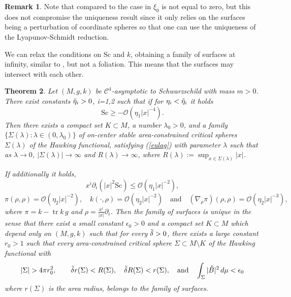 \documentclass[12pt,a4paper]{amsart}
\theoremstyle{plain}
\newtheorem{theorem}{Theorem}[section]
\theoremstyle{definition}
\newtheorem{remark}[theorem]{Remark}
\newcommand{\tr}{\operatorname{tr}}
\begin{document}
\begin{remark}
    Note that compared to the case in \cite{eichko} $\xi_0 $ is not equal to zero, but this does not compromise the uniqueness result since it only relies on the surfaces being a perturbation of coordinate spheres so that one can use the uniqueness of the Lyapunov-Schmidt reduction.
\end{remark}
We can relax the conditions on $\mathrm{Sc}$ and $k$, obtaining a family of surfaces at infinity, similar to \cite[Theorem 6]{willcen}, but not a foliation. This means that the surfaces may intersect with each other. 
\begin{theorem}\label{family}
     Let $(M,g,k)$ be $ \mathcal{C}^4$-asymptotic to Schwarzschild with mass $m>0$. There exist constants $ \Tilde{\eta}_i>0$, i=1,2 such that if for $\eta_i< \Tilde{\eta}_i $ it holds 
     \begin{equation}
         \mathrm{Sc} \geq -\mathcal{O} (\eta_1 |x|^{-4}). 
     \end{equation}
  Then there exists a compact set \(K \subset M\), a number \(\lambda_0 > 0\), and a family
\(\{\Sigma(\lambda) : \lambda \in (0, \lambda_0)\}\) of on-center stable area-constrained critical
spheres \(\Sigma(\lambda)\) of the Hawking functional,  satisfying (\ref{eulag}) with parameter \(\lambda\) such that as $\lambda \to 0$, $|\Sigma(\lambda)|\to \infty$ and   $ R(\lambda) \to \infty$, where $R(\lambda):=\sup_{x \in \Sigma(\lambda) } |x|$. 

If additionally it holds,
\begin{equation}\label{condiuni1}
    x^i \partial_i (|x|^2 \mathrm{Sc}) \leq \mathcal{O} (\eta_1 |x|^{-2}),
\end{equation}
\begin{equation}\label{condiuni2}
    \pi (\rho, \rho) = \mathcal{O} (\eta_2  | x|^{-2}), \quad k(\cdot, \rho) = \mathcal{O} ( \eta_2| x|^{-2})\quad \text{and} \quad (\nabla_{\rho} \pi )(\rho, \rho)= \mathcal{O} (\eta_2| x|^{-3}),
\end{equation}
where $\pi = k - \tr k\, g$ and $\rho= \frac{x^i}{|x|}\partial_i$. Then the family of surfaces is unique in the sense that there exist a small constant \(\epsilon_0 > 0\) and a compact set
\(K \subset M\) which depend only on \((M, g, k)\) such that  for every \(\Tilde{\delta} > 0\), there exists a large constant \(r_0 > 1\) such that every area-constrained critical sphere \(\Sigma \subset M \setminus K\) of the Hawking functional with
\[
|\Sigma| > 4 \pi r_0^2, \quad \quad \Tilde{\delta} r(\Sigma) < R(\Sigma), \quad \Tilde{\delta} R(\Sigma) < r(\Sigma), \quad \text{and}\quad \int_{\Sigma} |\mathring{B}|^2 \, d\mu < \epsilon_0 
\]
 where $r(\Sigma)$ is the area radius, belongs to the family of surfaces.\end{theorem}
\end{document}
